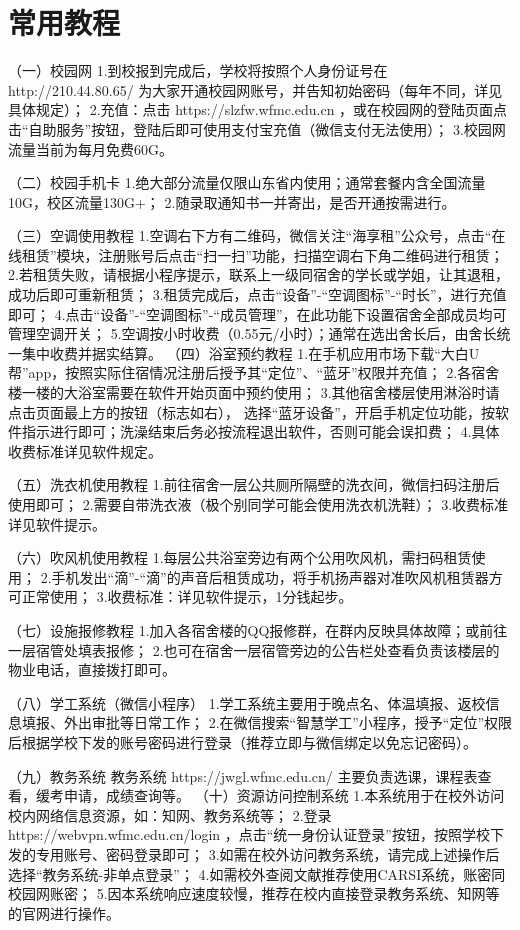 \chapter[常用教程]{常用教程}

（一）校园网
1.到校报到完成后，学校将按照个人身份证号在 http://210.44.80.65/ 为大家开通校园网账号，并告知初始密码（每年不同，详见具体规定）；
2.充值：点击 https://slzfw.wfmc.edu.cn ，或在校园网的登陆页面点击“自助服务”按钮，登陆后即可使用支付宝充值（微信支付无法使用）；
3.校园网流量当前为每月免费60G。

（二）校园手机卡
1.绝大部分流量仅限山东省内使用；通常套餐内含全国流量10G，校区流量130G+；
2.随录取通知书一并寄出，是否开通按需进行。

（三）空调使用教程
1.空调右下方有二维码，微信关注“海享租”公众号，点击“在线租赁”模块，注册账号后点击“扫一扫”功能，扫描空调右下角二维码进行租赁；
2.若租赁失败，请根据小程序提示，联系上一级同宿舍的学长或学姐，让其退租，成功后即可重新租赁；
3.租赁完成后，点击“设备”-“空调图标”-“时长”，进行充值即可；
4.点击“设备”-“空调图标”-“成员管理”，在此功能下设置宿舍全部成员均可管理空调开关；
5.空调按小时收费（0.55元/小时）；通常在选出舍长后，由舍长统一集中收费并据实结算。
（四）浴室预约教程
1.在手机应用市场下载“大白U帮”app，按照实际住宿情况注册后授予其“定位”、“蓝牙”权限并充值；
2.各宿舍楼一楼的大浴室需要在软件开始页面中预约使用；
3.其他宿舍楼层使用淋浴时请点击页面最上方的按钮（标志如右），
选择“蓝牙设备”，开启手机定位功能，按软件指示进行即可；洗澡结束后务必按流程退出软件，否则可能会误扣费；
4.具体收费标准详见软件规定。

（五）洗衣机使用教程
1.前往宿舍一层公共厕所隔壁的洗衣间，微信扫码注册后使用即可；
2.需要自带洗衣液（极个别同学可能会使用洗衣机洗鞋）；
3.收费标准详见软件提示。

（六）吹风机使用教程
1.每层公共浴室旁边有两个公用吹风机，需扫码租赁使用；
2.手机发出“滴”-“滴”的声音后租赁成功，将手机扬声器对准吹风机租赁器方可正常使用；
3.收费标准：详见软件提示，1分钱起步。

（七）设施报修教程
1.加入各宿舍楼的QQ报修群，在群内反映具体故障；或前往一层宿管处填表报修；
2.也可在宿舍一层宿管旁边的公告栏处查看负责该楼层的物业电话，直接拨打即可。

（八）学工系统（微信小程序）
1.学工系统主要用于晚点名、体温填报、返校信息填报、外出审批等日常工作；
2.在微信搜索“智慧学工”小程序，授予“定位”权限后根据学校下发的账号密码进行登录（推荐立即与微信绑定以免忘记密码）。

（九）教务系统
教务系统 https://jwgl.wfmc.edu.cn/ 主要负责选课，课程表查看，缓考申请，成绩查询等。
（十）资源访问控制系统
1.本系统用于在校外访问校内网络信息资源，如：知网、教务系统等；
2.登录 https://webvpn.wfmc.edu.cn/login ，点击“统一身份认证登录”按钮，按照学校下发的专用账号、密码登录即可；
3.如需在校外访问教务系统，请完成上述操作后选择“教务系统-非单点登录”；
4.如需校外查阅文献推荐使用CARSI系统，账密同校园网账密；
5.因本系统响应速度较慢，推荐在校内直接登录教务系统、知网等的官网进行操作。

